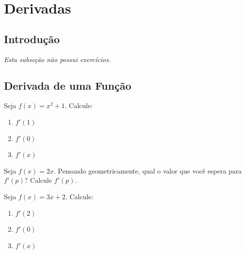 \setcounter{section}{6}
\setcounter{subsection}{0}

\section{Derivadas}


\subsection{Introdução}
\textit{Esta subseção não possui exercícios.}

\clearpage

\subsection{Derivada de uma Função}

{}
{}

\begin{exercicio}[1]
\label{ex:7.2.1}
Seja $f(x) = x^2 + 1$. Calcule:
\begin{enumerate}[label=\alph*)]
    \item $f'(1)$
    \item $f'(0)$
    \item $f'(x)$
\end{enumerate}
\end{exercicio}

\begin{exercicio}[2]
\label{ex:7.2.2}
Seja $f(x) = 2x$. Pensando geometricamente, qual o valor que você espera para $f'(p)$? Calcule $f'(p)$.
\end{exercicio}

\begin{exercicio}[3]
\label{ex:7.2.3}
Seja $f(x) = 3x + 2$. Calcule:
\begin{enumerate}[label=\alph*)]
    \item $f'(2)$
    \item $f'(0)$
    \item $f'(x)$
\end{enumerate}
\end{exercicio}

